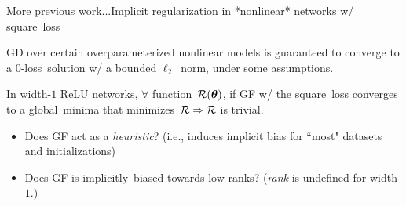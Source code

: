 \documentclass[handout,usenames,dvipsnames]{beamer} %
\newcommand{\btheta}{{\boldsymbol{\theta}}}
\newcommand{\calr}{{\cal R}}
\begin{document}
\begin{frame}{More previous work...}{Implicit regularization in *nonlinear* networks w/ square~loss}
    \pause
    \begin{block}{\cite{oymak2019overparameterized}}
         GD over certain overparameterized nonlinear models is guaranteed to converge to a 0-loss~solution w/ a bounded $\ell_2$~norm, under some assumptions.
    \end{block}
    \pause
    \begin{block}{\cite{vardi2021implicit}}
         In width-$1$ ReLU networks, $\forall$ function~$\calr(\btheta)$, if  GF w/ the square~loss converges to a global~minima that minimizes~$\calr \Rightarrow \calr$ is \alert{trivial}. %
    \end{block}
    \pause
    \begin{itemize}
        \item Does GF act as a \emph{heuristic}? (i.e., induces implicit bias for ``most" datasets and initializations)
        \pause
        \item Does GF is implicitly~biased towards low-ranks? (\emph{rank} is undefined for width $1$.)
    \end{itemize}
    

\end{frame}
\end{document}
